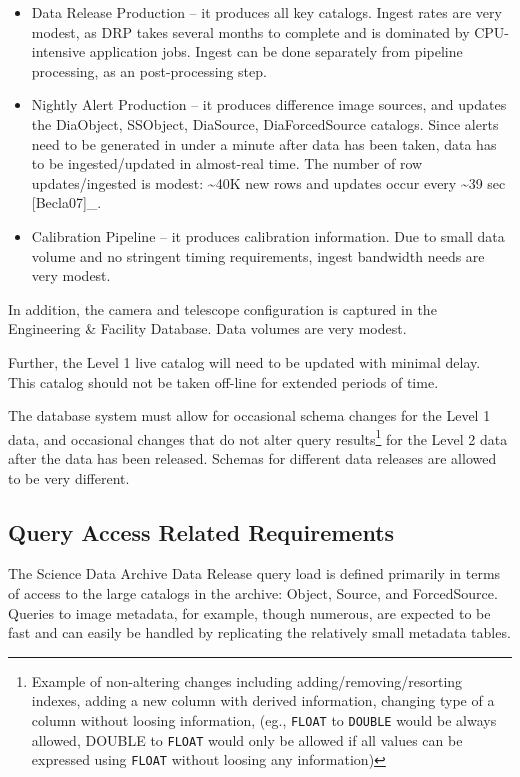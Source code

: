 \documentclass[DM,lsstdraft,toc]{lsstdoc}
\begin{document}
\begin{itemize}
\item
  Data Release Production -- it produces all key catalogs. Ingest rates
  are very modest, as DRP takes several months to complete and is
  dominated by CPU-intensive application jobs. Ingest can be done
  separately from pipeline processing, as an post-processing step.
\item
  Nightly Alert Production -- it produces difference image sources, and
  updates the DiaObject, SSObject, DiaSource, DiaForcedSource catalogs.
  Since alerts need to be generated in under a minute after data has
  been taken, data has to be ingested/updated in almost-real time. The
  number of row updates/ingested is modest: \textasciitilde{}40K new
  rows and updates occur every \textasciitilde{}39 sec {[}Becla07{]}\_.
\item
  Calibration Pipeline -- it produces calibration information. Due to
  small data volume and no stringent timing requirements, ingest
  bandwidth needs are very modest.
\end{itemize}

In addition, the camera and telescope configuration is captured in the
Engineering \& Facility Database. Data volumes are very modest.

Further, the Level 1 live catalog will need to be updated with minimal
delay. This catalog should not be taken off-line for extended periods of
time.

The database system must allow for occasional schema changes for the
Level 1 data, and occasional changes that do not alter query
results\footnote{Example of non-altering changes including
  adding/removing/resorting indexes, adding a new column with derived
  information, changing type of a column without loosing information,
  (eg., \texttt{FLOAT} to \texttt{DOUBLE} would be always allowed,
  DOUBLE to \texttt{FLOAT} would only be allowed if all values can be
  expressed using \texttt{FLOAT} without loosing any information)} for
the Level 2 data after the data has been released. Schemas for different
data releases are allowed to be very different.

\subsection{Query Access Related
Requirements}\label{query-access-related-requirements}

The Science Data Archive Data Release query load is defined primarily in
terms of access to the large catalogs in the archive: Object, Source,
and ForcedSource. Queries to image metadata, for example, though
numerous, are expected to be fast and can easily be handled by
replicating the relatively small metadata tables.
\end{document}
